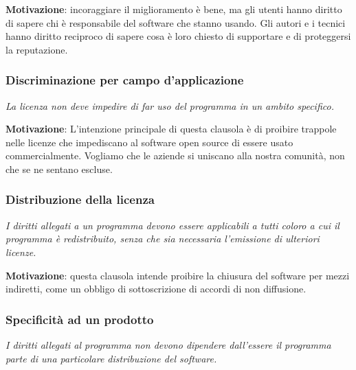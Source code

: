 \textbf{Motivazione}: incoraggiare il miglioramento è bene, ma gli utenti hanno diritto di sapere chi è responsabile del software che stanno usando. Gli autori e i tecnici hanno diritto reciproco di sapere cosa è loro chiesto di supportare e di proteggersi la reputazione.

\subsubsection{Discriminazione per campo d'applicazione}

\begin{center}

\textit{La licenza non deve impedire di far uso del programma in un ambito specifico.}

\end{center}

\textbf{Motivazione}: L'intenzione principale di questa clausola è di proibire trappole nelle licenze che impediscano al software open source di essere usato commercialmente. Vogliamo che le aziende si uniscano alla nostra comunità, non che se ne sentano escluse.

\subsubsection{Distribuzione della licenza}

\begin{center}

\textit{I diritti allegati a un programma devono essere applicabili a tutti coloro a cui il programma è redistribuito, senza che sia necessaria l'emissione di ulteriori licenze.}

\end{center}

\textbf{Motivazione}: questa clausola intende proibire la chiusura del software per mezzi indiretti, come un obbligo di sottoscrizione di accordi di non diffusione.

\subsubsection{Specificità ad un prodotto}

\begin{center}

\textit{I diritti allegati al programma non devono dipendere dall'essere il programma parte di una particolare distribuzione del software.}

\end{center}

